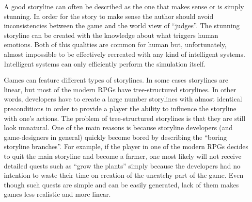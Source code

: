 A good storyline can often be described as the one that makes sense or is simply stunning. In order for the story to make sense the author should avoid inconsistencies between the game and the world view of ``judges''. The stunning storyline can be created with the knowledge about what triggers human emotions.
Both of this qualities are common for human but, unfortunately, almost impossible to be effectively recreated with any kind of intelligent systems. Intelligent systems can only efficiently perform the simulation itself.\par
Games can feature different types of storylines. In some cases storylines are linear, but most of the modern RPGs have tree-structured storylines. In other words, developers have to create a large number storylines with almost identical preconditions in order to provide a player the ability to influence the storyline with one's actions.
The problem of tree-structured storylines is that they are still look unnatural. One of the main reasons is because storyline developers (and game-designers in general) quickly become bored by describing the ``boring storyline branches''. For example, if the player in one of the modern RPGs decides to quit the main storyline and become a farmer, one most likely will not receive detailed quests such as ``grow the plants'' simply because the developers had no intention to waste their time on creation of the uncatchy part of the game. Even though such quests are simple and can be easily generated, lack of them makes games less realistic and more linear. 